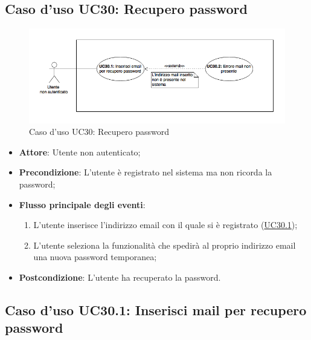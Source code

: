 \documentclass[12pt,a4paper]{article}
\begin{document}
\subsection{Caso d'uso UC30: Recupero password}
\begin{figure}[H]
	\centering
	\includegraphics[width=\textwidth]{diagramUC30.png}
	\caption{Caso d'uso UC30: Recupero password}\label{fig:UC30} 
\end{figure}
\begin{itemize}

\item \textbf{Attore}: Utente non autenticato; 
\item \textbf{Precondizione}: L'utente è registrato nel sistema ma non ricorda la password;

\item \textbf{Flusso principale degli eventi}:
\begin{enumerate}
	\item L'utente inserisce l'indirizzo email con il quale si è registrato (\hyperlink{UC30.1}{UC30.1});
	\item L'utente seleziona la funzionalità che spedirà al proprio indirizzo email una nuova password temporanea;
	
\end{enumerate}
\item \textbf{Postcondizione}: L'utente ha recuperato la password.
\end{itemize}
\hypertarget{UC30.1}{}
\subsection{Caso d'uso UC30.1: Inserisci mail per recupero password}
\end{document}
